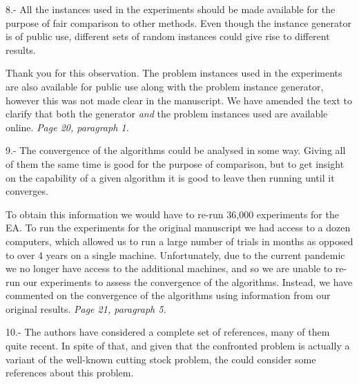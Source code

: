 \documentclass[a4paper,11pt]{article}
\newcommand{\ea}[1]{{\color{myRed}#1}}
\newcommand{\other}[1]{{\color{myPurple1}#1}}
\newcommand{\resp}[1]{{\color{myDarkBlue2}#1}} %
\begin{document}

8.- All the instances used in the experiments should be made available for the purpose of fair comparison to other methods. Even though the instance generator is of public use, different sets of random instances could give rise to different results.


\resp{Thank you for this observation. The problem instances used in the experiments are also available for public use along with the problem instance generator, however this was not made clear in the manuscript. We have amended the text to clarify that both the generator \emph{and} the problem instances used are available online. \textit{Page 20, paragraph 1.}}


9.- The convergence of the algorithms could be analysed in some way. Giving all of them the same time is good for the purpose of comparison, but to get insight on the capability of a given algorithm it is good to leave then running until it converges.


\resp{To obtain this information we would have to re-run 36,000 experiments for the EA. To run the experiments for the original manuscript we had access to a dozen computers, which allowed us to run a large number of trials in months as opposed to over 4 years on a single machine. Unfortunately, due to the current pandemic we no longer have access to the additional machines, and so we are unable to re-run our experiments to assess the convergence of the algorithms. Instead, we have commented on the convergence of the algorithms using information from our original results. \textit{Page 21, paragraph 5.}}


10.- The authors have considered a complete set of references, many of them quite recent. In spite of that, and given that the confronted problem is actually a variant of the well-known cutting stock problem, the could consider some references about this problem.
\end{document}
